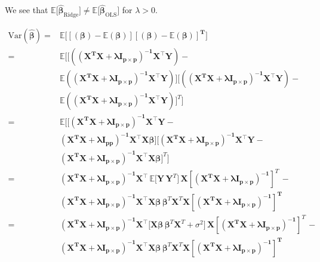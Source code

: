 \documentclass[a4paper,12pt]{article}
\begin{document}
\noindent
We see that
$\mathbb{E} \big[ \hat{\boldsymbol{\beta}}_{\mathrm{Ridge}} \big] \not= \mathbb{E} \big[\hat{\boldsymbol{\beta}}_{\mathrm{OLS}}\big ]$ for $\lambda > 0$.

\begin{equation} \label{eq1}
\begin{split}
\mbox{Var}(\boldsymbol{\hat{\beta}}) =& \mathbb{E} \big[[\boldsymbol{(\beta)} - \mathbb{E}(\boldsymbol{\beta})] [\boldsymbol{(\beta)} - \mathbb{E}(\boldsymbol{\beta})]^{\boldsymbol{T}} \big]\\
=& \mathbb{E} \big[[\boldsymbol{((\mathbf{X}^{T} \mathbf{X} + \lambda \mathbf{I}_{p \times p})^{-1} \mathbf{X}^{\top} \mathbf{Y})} -\\
& \mathbb{E}(\boldsymbol{(\mathbf{X}^{T} \mathbf{X} + \lambda \mathbf{I}_{p \times p})^{-1} \mathbf{X}^{\top} \mathbf{Y}})] [\boldsymbol{((\mathbf{X}^{T} \mathbf{X} + \lambda \mathbf{I}_{p \times p})^{-1} \mathbf{X}^{\top} \mathbf{Y})} - \\
&\mathbb{E}(\boldsymbol{(\mathbf{X}^{T} \mathbf{X} + \lambda \mathbf{I}_{p \times p})^{-1} \mathbf{X}^{\top} \mathbf{Y}})]^{T} \big]\\
 =& \mathbb{E} \big[[\boldsymbol{(\mathbf{X}^{T} \mathbf{X} + \lambda \mathbf{I}_{p \times p})^{-1} \mathbf{X}^{\top}\mathbf{Y} } -\\ &\boldsymbol{(\mathbf{X}^{T} \mathbf{X} + \lambda \mathbf{I}_{pp})^{-1} \mathbf{X}^{\top} \mathbf{X}}\boldsymbol{\beta}] [\boldsymbol{(\mathbf{X}^{T} \mathbf{X} + \lambda \mathbf{I}_{p \times p})^{-1} \mathbf{X}^{\top} \mathbf{Y}} -\\ &\boldsymbol{(\mathbf{X}^{T} \mathbf{X} + \lambda \mathbf{I}_{p \times p})^{-1} \mathbf{X}^{\top} \mathbf{X}}\boldsymbol{\beta}]^{T} \big]\\
=& \boldsymbol{(\mathbf{X}^{T} \mathbf{X} + \lambda \mathbf{I}_{p \times p})^{-1} \mathbf{X}^{\top}} \, \mathbb{E} \big[ \mathbf{Y} \, \mathbf{Y}^{T} \big] \, \mathbf{X}[\boldsymbol{(\mathbf{X}^{T} \mathbf{X} + \lambda \mathbf{I}_{p \times p})^{-1}}]^T \,  -\\ &\boldsymbol{(\mathbf{X}^{T} \mathbf{X} + \lambda \mathbf{I}_{p \times p})^{-1} \mathbf{X}^{\top}\mathbf{X}} \boldsymbol{\beta} \, \boldsymbol{\beta}^{T}\mathbf{X}^{T} \mathbf{X}[\boldsymbol{(\mathbf{X}^{T} \mathbf{X} + \lambda \mathbf{I}_{p \times p})^{-1}}]^{\boldsymbol{T}}\\
=& \boldsymbol{(\mathbf{X}^{T} \mathbf{X} + \lambda \mathbf{I}_{p \times p})^{-1} \mathbf{X}^{\top}}  \big[ \mathbf{X} \boldsymbol{\beta} \, \boldsymbol{\beta}^{T}\mathbf{X}^{T} + \sigma^2 \big] \, \mathbf{X}[\boldsymbol{(\mathbf{X}^{T} \mathbf{X} + \lambda \mathbf{I}_{p \times p})^{-1}}]^T \,  -\\ &\boldsymbol{(\mathbf{X}^{T} \mathbf{X} + \lambda \mathbf{I}_{p \times p})^{-1} \mathbf{X}^{\top}\mathbf{X}} \boldsymbol{\beta} \, \boldsymbol{\beta}^{T}\mathbf{X}^{T} \mathbf{X}[\boldsymbol{(\mathbf{X}^{T} \mathbf{X} + \lambda \mathbf{I}_{p \times p})^{-1}}]^{\boldsymbol{T}}\\

\end{split}
\end{equation}
\end{document}
